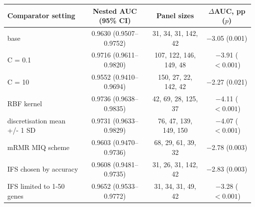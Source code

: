 \begin{tabular}{lccc}
\toprule
Comparator setting & Nested AUC (95\% CI) & Panel sizes & $\Delta$AUC, pp ($p$) \\
\midrule
base & 0.9630 (0.9507--0.9752) & 31, 34, 31, 142, 42 & $-$3.05 (0.001) \\
C = 0.1 & 0.9716 (0.9611--0.9820) & 107, 122, 146, 149, 48 & $-$3.91 ($<0.001$) \\
C = 10 & 0.9552 (0.9410--0.9694) & 150, 27, 22, 142, 42 & $-$2.27 (0.021) \\
RBF kernel & 0.9736 (0.9638--0.9835) & 42, 69, 28, 125, 37 & $-$4.11 ($<0.001$) \\
discretisation mean +/- 1 SD & 0.9731 (0.9633--0.9829) & 76, 47, 139, 149, 150 & $-$4.07 ($<0.001$) \\
mRMR MIQ scheme & 0.9603 (0.9470--0.9736) & 68, 29, 61, 39, 32 & $-$2.78 (0.003) \\
IFS chosen by accuracy & 0.9608 (0.9481--0.9735) & 31, 26, 31, 142, 42 & $-$2.83 (0.003) \\
IFS limited to 1-50 genes & 0.9652 (0.9533--0.9772) & 31, 34, 31, 49, 42 & $-$3.28 ($<0.001$) \\
\bottomrule
\end{tabular}
